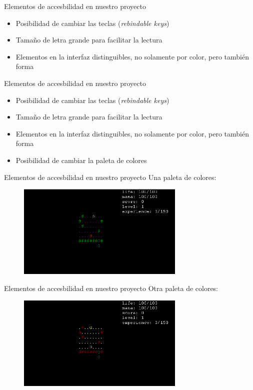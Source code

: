 \begin{tframe}{Elementos de accesbilidad en nuestro proyecto}
	\begin{itemize}
		\item Posibilidad de cambiar las teclas (\textit{rebindable keys})
		\item Tamaño de letra grande para facilitar la lectura
		\item<+-| alert@+> Elementos en la interfaz distinguibles, no solamente por color, pero también forma
	\end{itemize}
\end{tframe}

\begin{tframe}{Elementos de accesbilidad en nuestro proyecto}
	\begin{itemize}
		\item Posibilidad de cambiar las teclas (\textit{rebindable keys})
		\item Tamaño de letra grande para facilitar la lectura
		\item Elementos en la interfaz distinguibles, no solamente por color, pero también forma
		\item<+-| alert@+> Posibilidad de cambiar la paleta de colores
	\end{itemize}
\end{tframe}

\begin{tframe}{Elementos de accesbilidad en nuestro proyecto}
	Una paleta de colores:
		\begin{figure}[h]
			\includegraphics[width=8cm]{../img/paletaColores1.PNG}
		\end{figure}
\end{tframe}

\begin{tframe}{Elementos de accesbilidad en nuestro proyecto}
	Otra paleta de colores:
		\begin{figure}[h]
			\includegraphics[width=8cm]{../img/paletaColores2.PNG}
		\end{figure}
\end{tframe}

